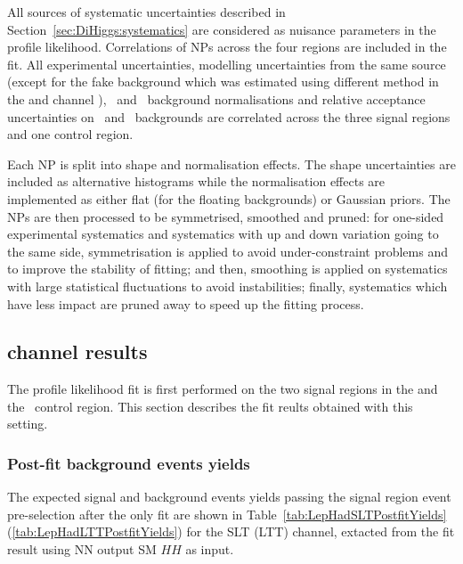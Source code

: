 All sources of systematic uncertainties described in Section~\ref{sec:DiHiggs:systematics} 
are considered as nuisance parameters
in the profile likelihood. 
Correlations of NPs across the four regions are included in the fit.
All experimental uncertainties,
modelling uncertainties from the same source 
(except for the fake background which was estimated using different
method in the \lephad and \hadhad channel ),
\ttbar\ and \ZHF\ background normalisations and 
relative acceptance uncertainties on \ttbar\ and \ZHF\ backgrounds
are correlated across the three signal regions and one control region. 


Each NP is split into shape and normalisation effects. 
The shape uncertainties are included as alternative histograms while the
normalisation effects are implemented as either flat (for the floating backgrounds)
or Gaussian priors. 
The NPs are then processed to be symmetrised, smoothed and pruned:
for one-sided experimental systematics and systematics with up and 
down variation going to the same side, symmetrisation is applied to 
avoid under-constraint problems and to improve the stability of fitting;
and then, smoothing is applied on systematics with large 
statistical fluctuations to avoid instabilities;
finally, systematics which have less impact are pruned away to speed up
the fitting process.






\subsection{\lephad channel results}
\label{sec:DiHiggs:lephadonly}
The profile likelihood fit is first performed on the two signal regions 
in the \lephad and the \ZHF\ control region. 
This section describes the fit reults obtained with this setting. 

\subsubsection{Post-fit background events yields}

The expected signal and background events yields  
passing the signal region event pre-selection after the \lephad only fit 
are shown in Table~\ref{tab:LepHadSLTPostfitYields} 
(\ref{tab:LepHadLTTPostfitYields}) for the SLT (LTT) channel, extacted from the 
fit result using NN output SM $HH$ as input. 



